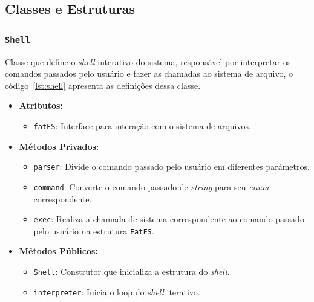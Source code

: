 \documentclass[
    12pt,				%
    oneside,   	        %
    a4paper,			%
    english,			%
    french,				%
    spanish,			%
    brazil,				%
    ]{pacotes/abntex2}
\begin{document}
\subsection{Classes e Estruturas}
\label{subsec:classes_estruturas}

\subsubsection{\texttt{Shell}}
\label{subsubsec:shell}

Classe que define o \textit{shell} interativo do sistema, responsável por interpretar os comandos passados pelo usuário e fazer as chamadas ao sistema de arquivo, o código~\ref{lst:shell} apresenta as definições dessa classe.

\begin{itemize}
    \item \textbf{Atributos:}
        \begin{itemize}
            \item \texttt{fatFS}: Interface para interação com o sistema de arquivos.
        \end{itemize}
    \item \textbf{Métodos Privados:}
        \begin{itemize}
            \item \texttt{parser}: Divide o comando passado pelo usuário em diferentes parâmetros.
            
            \item \texttt{command}: Converte o comando passado de \textit{string} para seu \textit{enum} correspondente.
            
            \item \texttt{exec}: Realiza a chamada de sistema correspondente ao comando passado pelo usuário na estrutura \texttt{FatFS}.
        \end{itemize}
            
    \item \textbf{Métodos Públicos:}
        \begin{itemize}
            \item \texttt{Shell}: Construtor que inicializa a estrutura do \textit{shell}.
            
            \item \texttt{interpreter}: Inicia o loop do \textit{shell} iterativo.
        \end{itemize}
\end{itemize}
\end{document}
